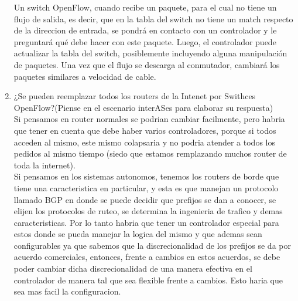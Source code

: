 \begin{enumerate}
			Un switch OpenFlow, cuando recibe un paquete, para el cual no tiene un flujo de salida, es decir, que en la tabla del 				switch no tiene un match respecto de la direccion de entrada, se pondrá en contacto con un controlador y le preguntará 				qué debe hacer con este paquete. Luego, el controlador puede actualizar la tabla del switch, posiblemente incluyendo 				alguna manipulación de paquetes. Una vez que el flujo se descarga al conmutador, cambiará los paquetes similares a 				velocidad de cable.
		\item ¿Se pueden reemplazar todos los routers de la Intenet por Swithces OpenFlow?(Piense en el escenario interASes para 			elaborar su respuesta)\\
			Si pensamos en router normales se podrian cambiar facilmente, pero habria que tener en cuenta que debe haber varios 				controladores, porque si todos acceden al mismo, este mismo colapsaria y no podria atender a todos los pedidos al mismo 			tiempo (siedo que estamos remplazando muchos router de toda la internet). \\
			Si pensamos en los sistemas autonomos, tenemos los routers de borde que tiene una caracteristica en particular, y esta 				es que manejan un protocolo llamado BGP en donde se puede decidir que prefijos se dan a conocer, se elijen los 				protocolos de ruteo, se determina la ingenieria de trafico y demas caracteristicas. Por lo tanto habria que tener un 				controlador especial para estos donde se pueda manejar la logica del mismo y que ademas sean configurables ya que 				sabemos que la discrecionalidad de los prefijos se da por acuerdo comerciales, entonces, frente a cambios en estos 				acuerdos, se debe poder cambiar dicha discrecionalidad de una manera efectiva en el controlador de manera tal que sea 				flexible frente a cambios. Esto haria que sea mas facil la configuracion.
	\end{enumerate}

